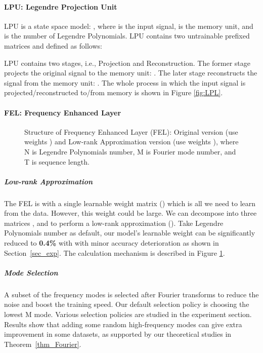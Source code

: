 \documentclass{article}
\begin{document}
\paragraph{LPU: Legendre Projection Unit} LPU is a state space model: , where  is the input signal,  is the memory unit, and  is the number of Legendre Polynomials. LPU contains two untrainable prefixed matrices  and  defined as follows:

LPU contains two stages, i.e., Projection and Reconstruction. The former stage projects the original signal to the memory unit: . The later stage reconstructs the signal from the memory unit: . The whole process in which the input signal is projected/reconstructed to/from memory  is shown in Figure \ref{fig:LPL}.


\paragraph{FEL: Frequency Enhanced Layer} \begin{figure}[t]
    \begin{minipage}{\linewidth}
     \centering
    \end{minipage}
    \caption{Structure of Frequency Enhanced Layer (FEL): Original version (use weights ) and Low-rank Approximation version (use weights ), where N is Legendre Polynomials number, M is Fourier mode number, and T is sequence length.}
    \label{fig:FEL}
\vskip -0.1in
\end{figure}

\subparagraph{Low-rank Approximation} The FEL is with a single learnable weight matrix () which is all we need to learn from the data. However, this weight could be large. We can decompose  into three matrices ,  and  to perform a low-rank approximation (). Take Legendre Polynomials number  as default, our model's learnable weight can be significantly reduced to \textbf{0.4\%} with  with minor accuracy deterioration as shown in Section~\ref{sec_exp}. The calculation mechanism is described in Figure \ref{fig:FEL}.


\subparagraph{Mode Selection}
A subset of the frequency modes is selected after Fourier transforms to reduce the noise and boost the training speed. Our default selection policy is choosing the lowest M mode. Various selection policies are studied in the experiment section. Results show that adding some random high-frequency modes can give extra improvement in some datasets, as supported by our theoretical studies in Theorem~\ref{thm_Fourier}.
\end{document}
